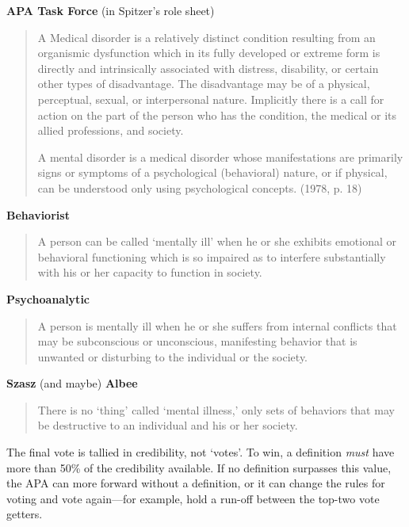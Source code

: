 \begin{refsection}
\textbf{APA Task Force} (in Spitzer’s role sheet)

\begin{quote}

A Medical disorder is a relatively distinct condition resulting from an organismic dysfunction which in its fully developed or extreme form is directly and intrinsically associated with distress, disability, or certain other types of disadvantage. The disadvantage may be of a physical, perceptual, sexual, or interpersonal nature. Implicitly there is a call for action on the part of the person who has the condition, the medical or its allied professions, and society.

A mental disorder is a medical disorder whose manifestations are primarily signs or symptoms of a psychological (behavioral) nature, or if physical, can be understood only using psychological concepts. (1978, p. 18)
\end{quote}

\textbf{Behaviorist}

\begin{quote}

A person can be called `mentally ill' when he or she exhibits emotional or behavioral functioning which is so impaired as to interfere substantially with his or her capacity to function in society. 
\end{quote}

\textbf{Psychoanalytic} 

\begin{quote}

A person is mentally ill when he or she suffers from internal conflicts that may be subconscious or unconscious, manifesting behavior that is unwanted or disturbing to the individual or the society.
\end{quote}

\textbf{Szasz} (and maybe) \textbf{Albee}

\begin{quote}

There is no `thing' called `mental illness,' only sets of behaviors that may be destructive to an individual and his or her society.
\end{quote}

The final vote is tallied in credibility, not `votes'. To win, a definition \emph{must} have more than 50\% of the credibility available. If no definition surpasses this value, the APA can more forward without a definition, or it can change the rules for voting and vote again---for example, hold a run-off between the top-two vote getters. 


\end{refsection}

